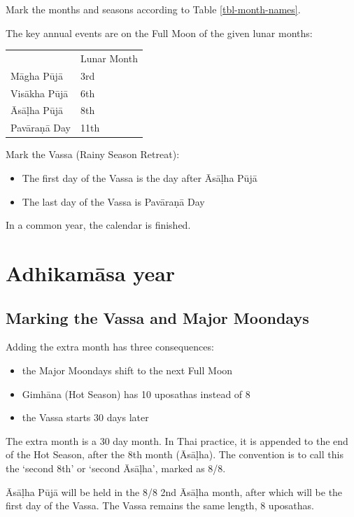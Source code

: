\documentclass[11pt,oneside]{memoir-article}
\begin{document}
Mark the months and seasons according to Table \ref{tbl-month-names}.

The key annual events are on the Full Moon of the given lunar months:

\begin{center}
\begin{tabular}{ll}
 & Lunar Month\\
Māgha Pūjā & 3rd\\
Visākha Pūjā & 6th\\
Āsāḷha Pūjā & 8th\\
Pavāraṇā Day & 11th\\
\end{tabular}
\end{center}

Mark the Vassa (Rainy Season Retreat):

\begin{itemize}
\item The first day of the Vassa is the day after Āsāḷha Pūjā
\item The last day of the Vassa is Pavāraṇā Day
\end{itemize}

In a common year, the calendar is finished. 

\section{Adhikamāsa year}
\label{sec-1-3}
\subsection{Marking the Vassa and Major Moondays}
\label{sec-1-3-1}

Adding the extra month has three consequences:

\begin{itemize}
\item the Major Moondays shift to the next Full Moon
\item Gimhāna (Hot Season) has 10 uposathas instead of 8
\item the Vassa starts 30 days later
\end{itemize}

The extra month is a 30 day month. In Thai practice, it is appended to the end
of the Hot Season, after the 8th month (Āsāḷha). The convention is to call this
the `second 8th' or `second Āsāḷha', marked as 8/8.

Āsāḷha Pūjā will be held in the 8/8 2nd Āsāḷha month, after which will be the
first day of the Vassa. The Vassa remains the same length, 8 uposathas.
\end{document}

